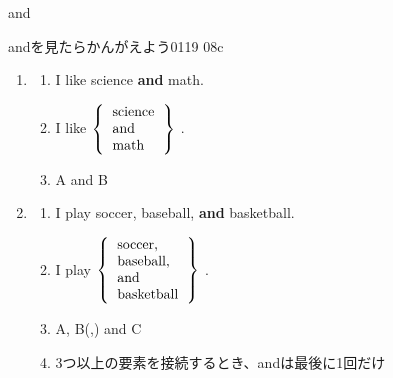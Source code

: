 \documentclass[aspectratio=169,xcolor={dvipsnames,table}]{beamer}
\begin{document}
\begin{frame}[plain]{and}
  \hypertarget{AND}{}

  andを見たらかんがえよう\hfill{\tiny 0119}\,{\scriptsize {}}\,{\tiny 08c}

  \begin{enumerate}[<+->]
    \item \begin{enumerate}\setlength{\itemsep}{5pt}
            \item I like science \textbf{and} math.
            \item I like $\left\{ \begin{tabular}{l}
                      science \\
                      and     \\
                      math    \\
                    \end{tabular}\right\}$ .
            \item A and B
          \end{enumerate}
    \item \begin{enumerate}\setlength{\itemsep}{5pt}
            \item I play soccer, baseball, \textbf{and} basketball.
            \item I play $\left\{ \begin{tabular}{l}
                      soccer,    \\
                      baseball,  \\
                      and        \\
                      basketball \\
                    \end{tabular}\right\}$ .
            \item A, B(,) and C
            \item 3つ以上の要素を接続するとき、andは最後に1回だけ
          \end{enumerate}
  \end{enumerate}

  \vspace{-20pt}

  \hfill\hyperlink{READING}{}
\end{frame}
\end{document}
